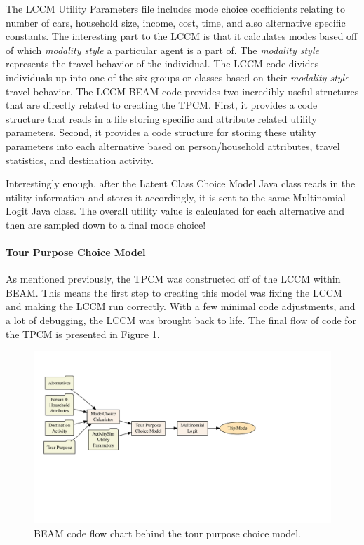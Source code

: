 \documentclass[3p, authoryear, review]{elsarticle} %
\begin{document}
The LCCM Utility Parameters file includes mode choice coefficients relating to number of cars, household size, income, cost, time, and also alternative specific constants. The interesting part to the LCCM is that it calculates modes based off of which \emph{modality style} a particular agent is a part of. The \emph{modality style} represents the travel behavior of the individual. The LCCM code divides individuals up into one of the six groups or classes based on their \emph{modality style} travel behavior. The LCCM BEAM code provides two incredibly useful structures that are directly related to creating the TPCM. First, it provides a code structure that reads in a file storing specific and attribute related utility parameters. Second, it provides a code structure for storing these utility parameters into each alternative based on person/household attributes, travel statistics, and destination activity.

Interestingly enough, after the Latent Class Choice Model Java class reads in the utility information and stores it accordingly, it is sent to the same Multinomial Logit Java class. The overall utility value is calculated for each alternative and then are sampled down to a final mode choice!

\hypertarget{tour-purpose-choice-model}{%
\paragraph{Tour Purpose Choice Model}\label{tour-purpose-choice-model}}

As mentioned previously, the TPCM was constructed off of the LCCM within BEAM. This means the first step to creating this model was fixing the LCCM and making the LCCM run correctly. With a few minimal code adjustments, and a lot of debugging, the LCCM was brought back to life. The final flow of code for the TPCM is presented in Figure \ref{fig:tpcmflow}.

\begin{figure}

{\centering \includegraphics{thesis_files/figure-latex/tpcmflow-1} 

}

\caption{BEAM code flow chart behind the tour purpose choice model.}\label{fig:tpcmflow}
\end{figure}
\end{document}
